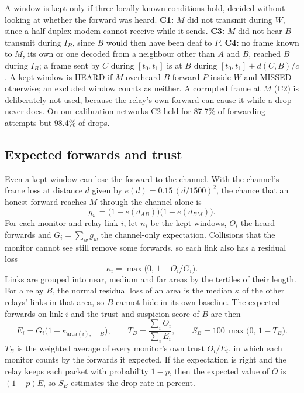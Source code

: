 \documentclass{article}
\begin{document}
\noindent
A window is kept only if three locally known conditions hold, decided without looking at whether the forward was heard. \textbf{C1:} $M$ did not transmit during $W$, since a half-duplex modem cannot receive while it sends. \textbf{C3:} $M$ did not hear $B$ transmit during $I_B$, since $B$ would then have been deaf to $P$. \textbf{C4:} no frame known to $M$, its own or one decoded from a neighbour other than $A$ and $B$, reached $B$ during $I_B$; a frame sent by $C$ during $[t_0,t_1]$ is at $B$ during $[t_0,t_1]+d(C,B)/c$. A kept window is HEARD if $M$ overheard $B$ forward $P$ inside $W$ and MISSED otherwise; an excluded window counts as neither. A corrupted frame at $M$ (C2) is deliberately not used, because the relay's own forward can cause it while a drop never does. On our calibration networks C2 held for 87.7\% of forwarding attempts but 98.4\% of drops.

\subsection{Expected forwards and trust}\label{sec:trust}
\noindent
Even a kept window can lose the forward to the channel. With the channel's frame loss at distance $d$ given by $e(d) = 0.15\,(d/1500)^2$, the chance that an honest forward reaches $M$ through the channel alone is
\begin{equation}
g_w = \bigl(1-e(d_{AB})\bigr)\bigl(1-e(d_{BM})\bigr).
\end{equation}
For each monitor and relay link $i$, let $n_i$ be the kept windows, $O_i$ the heard forwards and $G_i = \sum_w g_w$ the channel-only expectation. Collisions that the monitor cannot see still remove some forwards, so each link also has a residual loss
\begin{equation}
\kappa_i = \max\bigl(0,\, 1 - O_i/G_i\bigr).
\end{equation}
Links are grouped into near, medium and far areas by the tertiles of their length. For a relay $B$, the normal residual loss of an area is the median $\kappa$ of the other relays' links in that area, so $B$ cannot hide in its own baseline. The expected forwards on link $i$ and the trust and suspicion score of $B$ are then
\begin{equation}
E_i = G_i\bigl(1-\kappa_{\mathrm{area}(i),\,-B}\bigr), \qquad
T_B = \frac{\sum_i O_i}{\sum_i E_i}, \qquad
S_B = 100\,\max\bigl(0,\, 1 - T_B\bigr).
\end{equation}
$T_B$ is the weighted average of every monitor's own trust $O_i/E_i$, in which each monitor counts by the forwards it expected. If the expectation is right and the relay keeps each packet with probability $1-p$, then the expected value of $O$ is $(1-p)E$, so $S_B$ estimates the drop rate in percent.
\end{document}
